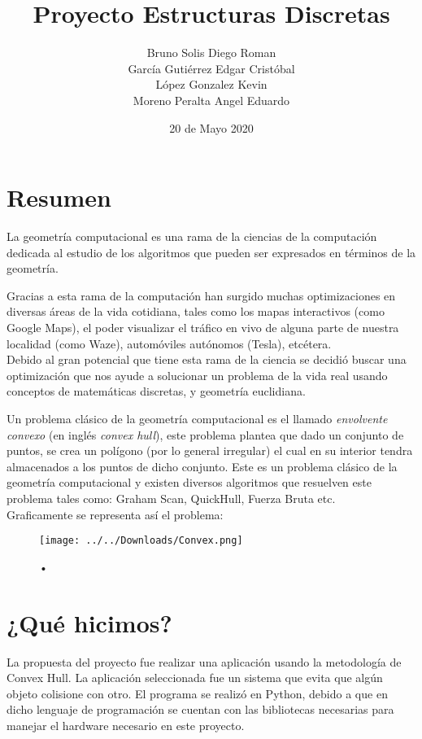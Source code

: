 \documentclass[]{article}
\title{Proyecto Estructuras Discretas}
\author{Bruno Solis Diego Roman\\García Gutiérrez Edgar Cristóbal\\López Gonzalez Kevin\\Moreno Peralta Angel Eduardo }
\date{20 de Mayo 2020}
\begin{document}
\maketitle
\section{Resumen}

La geometría computacional es una rama de la ciencias de la computación dedicada al estudio de los algoritmos que pueden ser expresados en términos de la geometría.

Gracias a esta rama de la computación han surgido muchas optimizaciones en diversas áreas de la vida cotidiana, tales como los mapas interactivos (como Google Maps), el poder visualizar el tráfico en vivo de alguna parte de nuestra localidad (como Waze), automóviles autónomos (Tesla), etcétera.\\
Debido al gran potencial que tiene esta rama de la ciencia se decidió buscar una optimización que nos ayude a solucionar un problema de la vida real usando conceptos de matemáticas discretas, y geometría euclidiana.

Un problema clásico de la geometría computacional es el llamado \textit{envolvente convexo} (en inglés \textit{convex hull}), este problema plantea que dado un conjunto de puntos, se crea un polígono (por lo general irregular) el cual en su interior tendra almacenados a los puntos de dicho conjunto. Este es un problema clásico de la geometría computacional y existen diversos algoritmos que resuelven este problema tales como: Graham Scan, QuickHull, Fuerza Bruta etc.\\
Graficamente se representa así el problema:\\\begin{figure}[hbtp]
\caption{•}
\centering
\texttt{[image: ../../Downloads/Convex.png]}
\end{figure}



\section{¿Qué hicimos?}
La propuesta del proyecto fue realizar una aplicación usando la metodología de Convex Hull. La aplicación seleccionada fue un sistema que evita que algún objeto colisione con otro. El programa se realizó en Python, debido a que en dicho lenguaje de programación se cuentan con las bibliotecas necesarias para manejar el hardware necesario en este proyecto.
\end{document}
